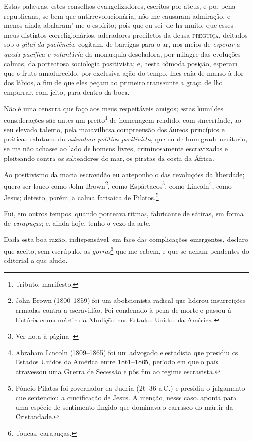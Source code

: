 Estas palavras, estes conselhos evangelizadores, escritos por ateus, e
por pena republicana, se bem que antirrevolucionária, não me causaram
admiração, e menos ainda abalaram"-me o espírito; pois que eu sei, de há
muito, que esses meus distintos correligionários, adoradores prediletos
da deusa \textsc{preguiça}, deitados sob o \emph{gitai da paciência}, cogitam, de
barrigas para o ar, nos meios de \emph{esperar a queda pacífica e
voluntária} da monarquia desoladora, por milagre das evoluções calmas,
da portentosa sociologia positivista; e, nesta cômoda posição, esperam
que o fruto amadurecido, por exclusiva ação do tempo, lhes caía de manso
à flor dos lábios, a fim de que eles peçam ao primeiro transeunte a
graça de lho empurrar, com jeito, para dentro da boca.

Não é uma censura que faço aos meus respeitáveis amigos; estas humildes
considerações são antes um preito\footnote{Tributo, manifesto.} de
homenagem rendido, com sinceridade, ao seu elevado talento, pela
maravilhosa compreensão dos áureos princípios e práticas salutares da
\emph{salvadora política positivista}, que eu de bom grado aceitaria, se
me não achasse ao lado de homens livres, criminosamente escravizados e
pleiteando contra os salteadores do mar, os piratas da costa da África.

Ao positivismo da macia escravidão eu anteponho o das revoluções da
liberdade; quero ser louco como John Brown\footnote{John Brown
  (1800--1859) foi um abolicionista radical que liderou insurreições
  armadas contra a escravidão. Foi condenado à pena de morte e passou à
  história como mártir da Abolição nos Estados Unidos da América.}, como
Espártacos\footnote{Ver nota à página \pageref{espartacos}.}, como Lincoln\footnote{Abraham Lincoln (1809--1865) foi
  um advogado e estadista que presidiu os Estados Unidos da América
  entre 1861--1865, período em que o país atravessou uma Guerra de
  Secessão e pôs fim ao regime escravista.}, como Jesus; detesto, porém,
a calma farisaica de Pilatos.\footnote{Pôncio Pilatos foi governador
  da Judeia (26--36 a.C.) e presidiu o julgamento que sentenciou a
  crucificação de Jesus. A menção, nesse caso, aponta para uma espécie
  de sentimento fingido que dominava o carrasco do mártir da
  Cristandade.}

Fui, em outros tempos, quando ponteava ritmas, fabricante de sátiras, em
forma de \emph{carapuças}; e, ainda hoje, tenho o vezo da arte.

Dada esta boa razão, indispensável, em face das complicações emergentes,
declaro que aceito, sem escrúpulo, as \emph{gorras}\footnote{Toucas,
  carapuças.} que me cabem, e que se acham pendentes do editorial a que
aludo.

